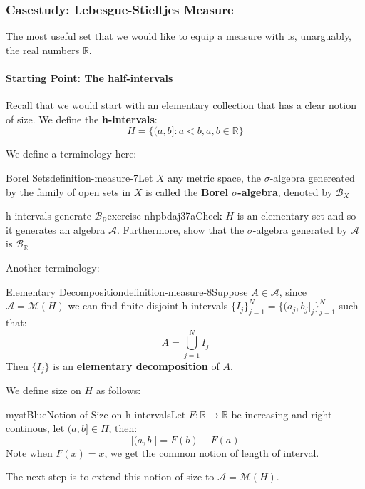 \subsubsection{Casestudy: Lebesgue-Stieltjes Measure}

The most useful set that we would like to equip a measure with is, unarguably, the real numbers $\mathbb{R}$.

\paragraph{Starting Point: The half-intervals}

Recall that we would start with an elementary collection that has a clear notion of size. We define the \textbf{h-intervals}:
\begin{equation}
H=\{(a,b]:a<b, a,b\in \mathbb{R}\}
\end{equation}

We define a terminology here:

\begin{mystthmdefinition}{Borel Sets}{definition-measure-7}Let $X$ any metric space, the $\sigma$-algebra genereated by the family of open sets in $X$ is called the \textbf{Borel $\sigma$-algebra}, denoted by $\mathcal B_{X}$

\end{mystthmdefinition}
\begin{mystexercise}{h-intervals generate $\mathcal B_{\mathbb{R}}$}{exercise-nhpbdaj37a}\label{exercise-NhPBdAJ37a}\label{exercise-nhpbdaj37a}Check $H$ is an elementary set and so it generates an algebra $\mathcal A$. Furthermore, show that the $\sigma$-algebra generated by $\mathcal A$ is   $\mathcal B_{\mathbb{R}}$

\end{mystexercise}
Another terminology:

\begin{mystthmdefinition}{Elementary Decomposition}{definition-measure-8}Suppose $A\in \mathcal A$, since $\mathcal A=\mathcal M(H)$ we can find finite disjoint h-intervals $\{I_j\}_{j=1}^N=\{(a_j,b_j]_j\}_{j=1}^N$ such that:
\begin{equation}
A=\bigcup_{j=1}^N I_j
\end{equation}
Then $\{I_j\}$ is an \textbf{elementary decomposition} of $A$.

\end{mystthmdefinition}
We define size on $H$ as follows:

\begin{mystadmonition}{mystBlue}{Notion of Size on h-intervals}Let $F:\mathbb{R}\to\mathbb{R}$ be increasing and right-continous, let $(a,b]\in H$, then:
\begin{equation}
|(a,b]|=F(b)-F(a)
\end{equation}
Note when $F(x)=x$, we get the common notion of length of interval.

\end{mystadmonition}
The next step is to extend this notion of size to $\mathcal A=\mathcal M(H)$.

